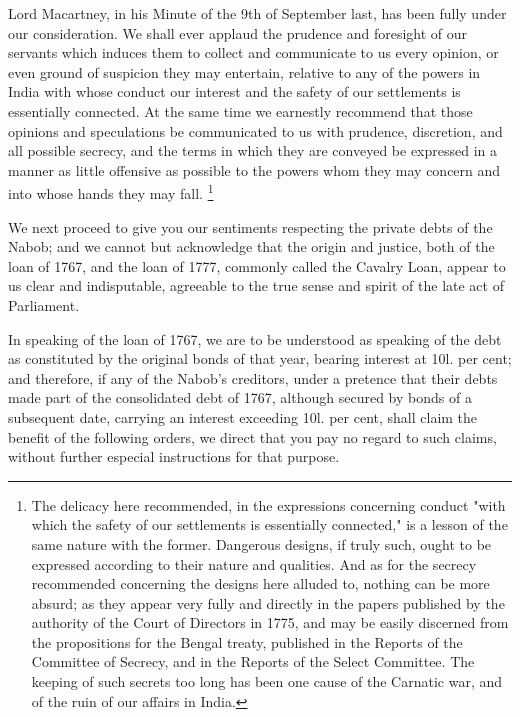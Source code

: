 Lord Macartney, in his Minute of the 9th of September last, has been fully under our consideration. We shall ever applaud the prudence and foresight of our servants which induces them to collect and communicate to us every opinion, or even ground of suspicion they may entertain, relative to any of the powers in India with whose conduct our interest and the safety of our settlements is essentially connected. At the same time we earnestly recommend that those opinions and speculations be communicated to us with prudence, discretion, and all possible secrecy, and the terms in which they are conveyed be expressed in a manner as little offensive as possible to the powers whom they may concern and into whose hands they may fall.
\footnote{ The delicacy here recommended, in the expressions concerning conduct "with which the safety of our settlements is essentially connected," is a lesson of the same nature with the former. Dangerous designs, if truly such, ought to be expressed according to their nature and qualities. And as for the secrecy recommended concerning the designs here alluded to, nothing can be more absurd; as they appear very fully and directly in the papers published by the authority of the Court of Directors in 1775, and may be easily discerned from the propositions for the Bengal treaty, published in the Reports of the Committee of Secrecy, and in the Reports of the Select Committee. The keeping of such secrets too long has been one cause of the Carnatic war, and of the ruin of our affairs in India.}


We next proceed to give you our sentiments respecting the private debts of the Nabob; and we cannot but acknowledge that the origin and justice, both of the loan of 1767, and the loan of 1777, commonly called the Cavalry Loan, appear to us clear and indisputable, agreeable to the true sense and spirit of the late act of Parliament.

In speaking of the loan of 1767, we are to be understood as speaking of the debt as constituted by the original bonds of that year, bearing interest at 10l. per cent; and therefore, if any of the Nabob's creditors, under a pretence that their debts made part of the consolidated debt of 1767, although secured by bonds of a subsequent date, carrying an interest exceeding 10l. per cent, shall claim the benefit of the following orders, we direct that you pay no regard to such claims, without further especial instructions for that purpose.

